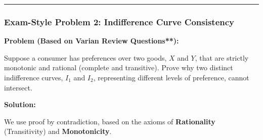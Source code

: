 \documentclass{article}
\begin{document}
\vspace{1em}\hrule\vspace{1em}

\subsubsection*{Exam-Style Problem 2: Indifference Curve Consistency}

\textbf{Problem (Based on Varian Review Questions**):}

Suppose a consumer has preferences over two goods, $X$ and $Y$, that are strictly monotonic and rational (complete and transitive). Prove why two distinct indifference curves, $I_1$ and $I_2$, representing different levels of preference, cannot intersect.

\textbf{Solution:}

We use proof by contradiction, based on the axioms of \textbf{Rationality} (Transitivity) and \textbf{Monotonicity}.
\end{document}
